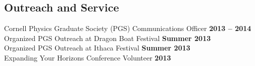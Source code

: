 \documentclass[margin,line]{res}
\begin{document}
\begin{resume}
\section{\sc Outreach and Service} 
Cornell Physics Graduate Society (PGS) Communications Officer \hfill \textbf{2013 -- 2014}\\
Organized PGS Outreach at Dragon Boat Festival \hfill \textbf{Summer 2013}\\
Organized PGS Outreach at Ithaca Festival \hfill \textbf{Summer 2013}\\
Expanding Your Horizons Conference Volunteer \hfill \textbf{2013}\\

\end{resume} 
\end{document}
